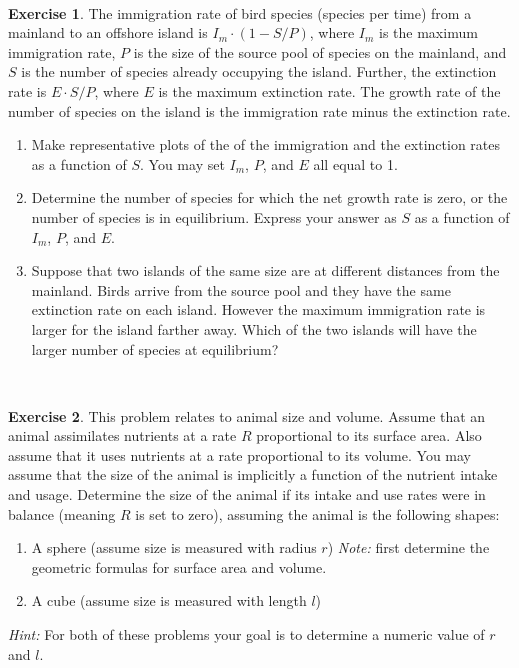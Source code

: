 \documentclass[
]{book}
\theoremstyle{definition}
\theoremstyle{definition}
\theoremstyle{definition}
\newtheorem{exercise}{Exercise}[chapter]
\theoremstyle{remark}
\begin{document}
~

\begin{exercise}
\protect\hypertarget{exr:unnamed-chunk-12}{}{\label{exr:unnamed-chunk-12} }The immigration rate of bird species (species per time) from a mainland to an offshore island is \(I_{m} \cdot (1-S/P)\), where \(I_{m}\) is the maximum immigration rate, \(P\) is the size of the source pool of species on the mainland, and \(S\) is the number of species already occupying the island. Further, the extinction rate is \(E \cdot S / P\), where \(E\) is the maximum extinction rate. The growth rate of the number of species on the island is the immigration rate minus the extinction rate.

\begin{enumerate}[label=\alph*.]
\item Make representative plots of the of the immigration and the extinction rates as a function of $S$.  You may set $I_{m}$, $P$, and $E$ all equal to 1.
\item Determine the number of species for which the net growth rate is zero, or the number of species is in equilibrium.  Express your answer as $S$ as a function of $I_{m}$, $P$, and $E$.
\item Suppose that two islands of the same size are at different distances from the mainland. Birds arrive from the source pool and they have the same extinction rate on each island.  However the maximum immigration rate is larger for the island farther away.  Which of the two islands will have the larger number of species at equilibrium?
\end{enumerate}
\end{exercise}

~

\begin{exercise}
\protect\hypertarget{exr:unnamed-chunk-13}{}{\label{exr:unnamed-chunk-13} }This problem relates to animal size and volume. Assume that an animal assimilates nutrients at a rate \(R\) proportional to its surface area. Also assume that it uses nutrients at a rate proportional to its volume. You may assume that the size of the animal is implicitly a function of the nutrient intake and usage. Determine the size of the animal if its intake and use rates were in balance (meaning \(R\) is set to zero), assuming the animal is the following shapes:

\begin{enumerate}[label=\alph*.]
\item A sphere (assume size is measured with radius $r$) \emph{Note:} first determine the geometric formulas for surface area and volume.
\item A cube (assume size is measured with length $l$)
\end{enumerate}

\emph{Hint:} For both of these problems your goal is to determine a numeric value of \(r\) and \(l\).
\end{exercise}
\end{document}
